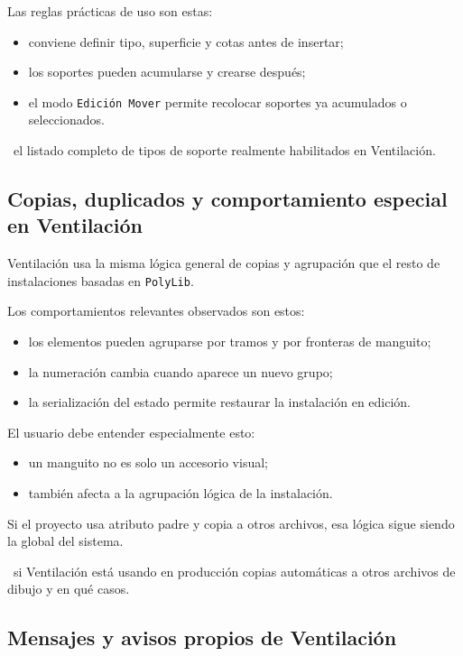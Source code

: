Las reglas prácticas de uso son estas:

\begin{itemize}
\item conviene definir tipo, superficie y cotas antes de insertar;
\item los soportes pueden acumularse y crearse después;
\item el modo \texttt{Edición Mover} permite recolocar soportes ya acumulados o seleccionados.
\end{itemize}

\pendingtag\ el listado completo de tipos de soporte realmente habilitados en Ventilación.


\subsection{Copias, duplicados y comportamiento especial en Ventilación}

Ventilación usa la misma lógica general de copias y agrupación que el resto de instalaciones basadas en \texttt{PolyLib}.

Los comportamientos relevantes observados son estos:

\begin{itemize}
\item los elementos pueden agruparse por tramos y por fronteras de manguito;
\item la numeración cambia cuando aparece un nuevo grupo;
\item la serialización del estado permite restaurar la instalación en edición.
\end{itemize}

El usuario debe entender especialmente esto:

\begin{itemize}
\item un manguito no es solo un accesorio visual;
\item también afecta a la agrupación lógica de la instalación.
\end{itemize}

Si el proyecto usa atributo padre y copia a otros archivos, esa lógica sigue siendo la global del sistema.

\pendingtag\ si Ventilación está usando en producción copias automáticas a otros archivos de dibujo y en qué casos.

\subsection{Mensajes y avisos propios de Ventilación}

